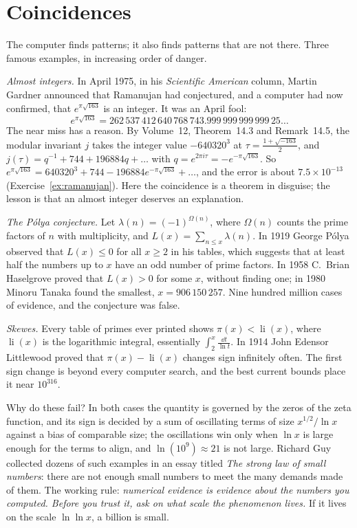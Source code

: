\section{Coincidences}

The computer finds patterns; it also finds patterns that are not there. Three famous examples, in increasing order of danger.

\emph{Almost integers.} In April 1975, in his \emph{Scientific American} column, Martin Gardner announced that Ramanujan had conjectured, and a computer had now
confirmed, that $e^{\pi\sqrt{163}}$ is an integer. It was an April fool:
\[
e^{\pi\sqrt{163}}=262\,537\,412\,640\,768\,743.999\,999\,999\,999\,25\dots
\]
The near miss has a reason. By Volume~12, Theorem~14.3 and Remark~14.5, the modular invariant $j$ takes the integer value $-640320^3$ at $\tau=\frac{1+\sqrt{-163}}2$, and $j(\tau)=q^{-1}+744+196884q+\dots$
with $q=e^{2\pi i\tau}=-e^{-\pi\sqrt{163}}$. So $e^{\pi\sqrt{163}}=640320^3+744-196884e^{-\pi\sqrt{163}}+\dots$, and the error is about $7.5\times10^{-13}$ (Exercise~\ref{ex:ramanujan}). Here the coincidence is a theorem in
disguise; the lesson is that an almost integer deserves an explanation.

\emph{The Pólya conjecture.} Let $\lambda(n)=(-1)^{\Omega(n)}$, where $\Omega(n)$ counts the prime factors of $n$ with multiplicity, and $L(x)=\sum_{n\le x}\lambda(n)$. In 1919 George Pólya
observed that $L(x)\le0$ for all $x\ge2$ in his tables, which suggests that at least half the numbers up to $x$ have an odd number of prime factors. In 1958 C.~Brian Haselgrove proved that
$L(x)>0$ for some $x$, without finding one; in 1980 Minoru Tanaka found the smallest, $x=906\,150\,257$. Nine hundred million cases of evidence, and the conjecture was false.

\emph{Skewes.} Every table of primes ever printed shows $\pi(x)<\operatorname{li}(x)$, where $\operatorname{li}(x)$ is the logarithmic integral, essentially $\int_2^x\frac{\dd t}{\ln t}$. In 1914
John Edensor Littlewood proved that $\pi(x)-\operatorname{li}(x)$ changes sign infinitely often. The first sign change is beyond every computer search, and the best
current bounds place it near $10^{316}$.

Why do these fail? In both cases the quantity is governed by the zeros of the zeta function, and its sign is decided by a sum of oscillating terms of size
$x^{1/2}/\ln x$ against a bias of comparable size; the oscillations win only when $\ln x$ is large enough for the terms to align, and $\ln(10^9)\approx21$ is not large.
Richard Guy collected dozens of such examples in an essay titled \emph{The strong law of small numbers}: there are not enough small numbers to meet the many demands
made of them. The working rule: \emph{numerical evidence is evidence about the numbers you computed. Before you trust it, ask on what scale the phenomenon lives.} If it
lives on the scale $\ln\ln x$, a billion is small.

